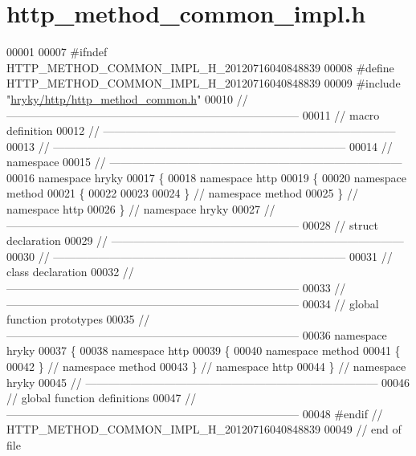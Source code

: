 \hypertarget{http__method__common__impl_8h_source}{\section{http\-\_\-method\-\_\-common\-\_\-impl.\-h}
}

\begin{DoxyCode}
00001 
00007 \textcolor{preprocessor}{#ifndef HTTP\_METHOD\_COMMON\_IMPL\_H\_20120716040848839}
00008 \textcolor{preprocessor}{}\textcolor{preprocessor}{#define HTTP\_METHOD\_COMMON\_IMPL\_H\_20120716040848839}
00009 \textcolor{preprocessor}{}\textcolor{preprocessor}{#include "\hyperlink{http__method__common_8h}{hryky/http/http_method_common.h}"}
00010 \textcolor{comment}{//
      ------------------------------------------------------------------------------}
00011 \textcolor{comment}{// macro definition}
00012 \textcolor{comment}{//
      ------------------------------------------------------------------------------}
00013 \textcolor{comment}{//
      ------------------------------------------------------------------------------}
00014 \textcolor{comment}{// namespace}
00015 \textcolor{comment}{//
      ------------------------------------------------------------------------------}
00016 \textcolor{keyword}{namespace }hryky
00017 \{
00018 \textcolor{keyword}{namespace }http
00019 \{
00020 \textcolor{keyword}{namespace }method
00021 \{
00022 
00023 
00024 \} \textcolor{comment}{// namespace method}
00025 \} \textcolor{comment}{// namespace http}
00026 \} \textcolor{comment}{// namespace hryky}
00027 \textcolor{comment}{//
      ------------------------------------------------------------------------------}
00028 \textcolor{comment}{// struct declaration}
00029 \textcolor{comment}{//
      ------------------------------------------------------------------------------}
00030 \textcolor{comment}{//
      ------------------------------------------------------------------------------}
00031 \textcolor{comment}{// class declaration}
00032 \textcolor{comment}{//
      ------------------------------------------------------------------------------}
00033 \textcolor{comment}{//
      ------------------------------------------------------------------------------}
00034 \textcolor{comment}{// global function prototypes}
00035 \textcolor{comment}{//
      ------------------------------------------------------------------------------}
00036 \textcolor{keyword}{namespace }hryky
00037 \{
00038 \textcolor{keyword}{namespace }http
00039 \{
00040 \textcolor{keyword}{namespace }method
00041 \{
00042 \} \textcolor{comment}{// namespace method}
00043 \} \textcolor{comment}{// namespace http}
00044 \} \textcolor{comment}{// namespace hryky}
00045 \textcolor{comment}{//
      ------------------------------------------------------------------------------}
00046 \textcolor{comment}{// global function definitions}
00047 \textcolor{comment}{//
      ------------------------------------------------------------------------------}
00048 \textcolor{preprocessor}{#endif // HTTP\_METHOD\_COMMON\_IMPL\_H\_20120716040848839}
00049 \textcolor{preprocessor}{}\textcolor{comment}{// end of file}
\end{DoxyCode}
